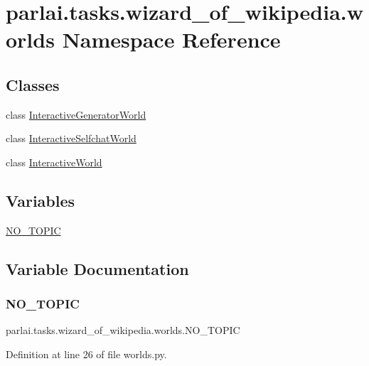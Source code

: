 \hypertarget{namespaceparlai_1_1tasks_1_1wizard__of__wikipedia_1_1worlds}{}\section{parlai.\+tasks.\+wizard\+\_\+of\+\_\+wikipedia.\+worlds Namespace Reference}
\label{namespaceparlai_1_1tasks_1_1wizard__of__wikipedia_1_1worlds}
\subsection*{Classes}
\begin{DoxyCompactItemize}
\item 
class \hyperlink{classparlai_1_1tasks_1_1wizard__of__wikipedia_1_1worlds_1_1InteractiveGeneratorWorld}{Interactive\+Generator\+World}
\item 
class \hyperlink{classparlai_1_1tasks_1_1wizard__of__wikipedia_1_1worlds_1_1InteractiveSelfchatWorld}{Interactive\+Selfchat\+World}
\item 
class \hyperlink{classparlai_1_1tasks_1_1wizard__of__wikipedia_1_1worlds_1_1InteractiveWorld}{Interactive\+World}
\end{DoxyCompactItemize}
\subsection*{Variables}
\begin{DoxyCompactItemize}
\item 
\hyperlink{namespaceparlai_1_1tasks_1_1wizard__of__wikipedia_1_1worlds_a3eb1939bb3f2c7969833d1a3d2ba5ea2}{N\+O\+\_\+\+T\+O\+P\+IC}
\end{DoxyCompactItemize}


\subsection{Variable Documentation}
\mbox{\label{namespaceparlai_1_1tasks_1_1wizard__of__wikipedia_1_1worlds_a3eb1939bb3f2c7969833d1a3d2ba5ea2}} 
\subsubsection{\texorpdfstring{N\+O\+\_\+\+T\+O\+P\+IC}{NO\_TOPIC}}
{\footnotesize\ttfamily parlai.\+tasks.\+wizard\+\_\+of\+\_\+wikipedia.\+worlds.\+N\+O\+\_\+\+T\+O\+P\+IC}



Definition at line 26 of file worlds.\+py.

